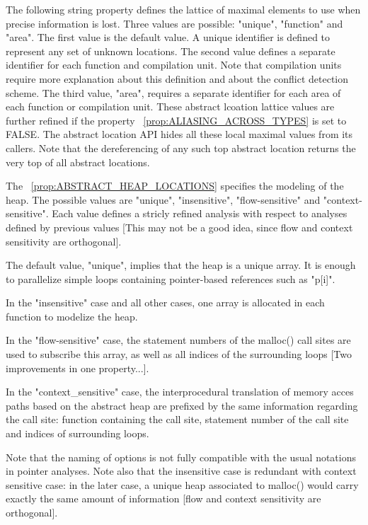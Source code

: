 \documentclass[a4paper]{report}
\newcommand{\PipsPropRef}[1]{\texttt{\detokenize{#1}}~\ref{prop:#1}}
\begin{document}
The following string property defines the lattice of maximal elements
to use when precise information is lost. Three values are possible:
"unique", "function" and "area". The first value is the default
value. A unique identifier is defined to represent any set of unknown
locations. The second value defines a separate identifier for each
function and compilation unit. Note that compilation units require
more explanation about this definition and about the conflict detection
scheme. The third value, "area", requires a separate identifier for
each area of each function or compilation unit. These abstract
lcoation lattice values are further refined if the property
\PipsPropRef{ALIASING_ACROSS_TYPES} is set to FALSE. The abstract
location API hides all these local maximal values from its
callers. Note that the dereferencing of any such top abstract location
returns the very top of all abstract locations.

The \PipsPropRef{ABSTRACT_HEAP_LOCATIONS} specifies the modeling of
the heap. The possible values are "unique", "insensitive",
"flow-sensitive" and "context-sensitive". Each value defines
 a stricly refined analysis with respect to analyses defined by
 previous values [This may not be a good idea, since flow and context
 sensitivity are orthogonal].

The default value, "unique", implies
 that the heap is a unique array. It is enough to parallelize simple
 loops containing pointer-based references such as
"p[i]".

In the "insensitive" case and all other cases, one array is
allocated in each function to modelize the heap.

In the "flow-sensitive" case, the statement numbers of the malloc()
call sites are used to subscribe this array, as well as all indices of
the surrounding loops [Two improvements in one property...].

In the "context\_sensitive" case, the interprocedural translation of
memory acces paths based on the abstract heap are prefixed by the same
information regarding the call site: function containing the call
site, statement number of the call site and indices of surrounding
loops.

Note that the naming of options is not fully compatible with
the usual notations in pointer analyses. Note also that the
insensitive case is redundant with context sensitive case: in the
later case, a unique heap associated to malloc() would carry exactly
the same amount of information [flow and context sensitivity are
orthogonal].
\end{document}
